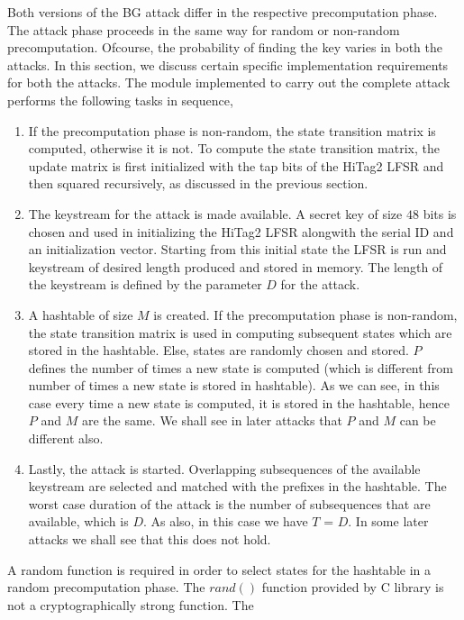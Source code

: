 Both versions of the BG attack differ in the respective precomputation phase. The attack phase proceeds in the same way for random or non-random precomputation. Ofcourse, the probability of finding the key varies in both the attacks. In this section, we discuss certain specific implementation requirements for both the attacks. The module implemented to carry out the complete attack performs the following tasks in sequence,
\begin{enumerate}
\item If the precomputation phase is non-random, the state transition matrix is computed, otherwise it is not. To compute the state transition matrix, the update matrix is first initialized with the tap bits of the HiTag2 LFSR and then squared recursively, as discussed in the previous section.
\item The keystream for the attack is made available. A secret key of size $48$ bits is chosen and used in initializing the HiTag2 LFSR alongwith the serial ID and an initialization vector. Starting from this initial state the LFSR is run and keystream of desired length produced and stored in memory.
The length of the keystream is defined by the parameter $D$ for the attack.
\item A hashtable of size $M$ is created. If the precomputation phase is non-random, the state transition matrix is used in computing subsequent states which are stored in the hashtable. Else, states are randomly chosen and stored. $P$ defines the number of times a new state is computed (which is different from number of times a new state is stored in hashtable). As we can see, in this case every time a new state is computed, it is stored in the hashtable, hence $P$ and $M$ are the same. We shall see in later attacks that $P$ and $M$ can be different also. 
\item Lastly, the attack is started. Overlapping subsequences of the available keystream are selected and matched with the prefixes in the hashtable. The worst case duration of the attack is the number of subsequences that are available, which is $D$. As also, in this case we have $T$ = $D$. In some later attacks we shall see that this does not hold. 
\end{enumerate}


A random function is required in order to select states for the hashtable in a random precomputation phase. The $rand()$ function provided by C library is not a cryptographically strong function. The 




